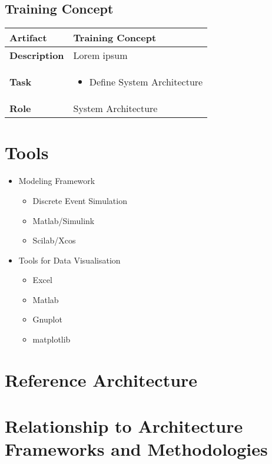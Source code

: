 \subsection{Training Concept}
 \label{table:ch6_Artifact_Training_Concept}
\begin{tabular}
	{|m{2cm}|m{10cm}|} \hline \bfseries Artifact & Training Concept\\
	\hline \bfseries Description & Lorem ipsum\\
	\hline \bfseries Task & 
	\begin{itemize}
		\item Define System Architecture 
	\end{itemize}
	\\
	\hline \bfseries Role & System Architecture\\
	\hline 
\end{tabular}

\section{Tools} %
\label{sec:ch6_tools}

\begin{itemize}
	\item Modeling Framework
	\begin{itemize}
		\item Discrete Event Simulation
		\item Matlab/Simulink
		\item Scilab/Xcos
	\end{itemize}
	\item Tools for Data Visualisation
	\begin{itemize}
		\item Excel
		\item Matlab
		\item Gnuplot
		\item matplotlib
	\end{itemize}
\end{itemize}


\section{Reference Architecture}

\section{Relationship to Architecture Frameworks and Methodologies} %
\label{sec:ch6_relation_frameworks}

